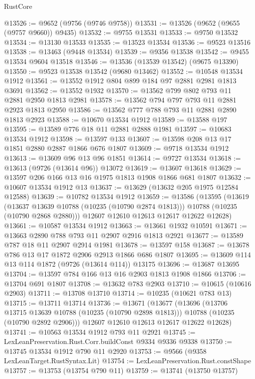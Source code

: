 \begin{lexlean}{RustCore}
\begin{coremodule}
@13526 := @9652 (@9756 (@9746 @9758))
@13531 := @13526 (@9652 (@9655 (@9757 @9660)) @9435)
@13532 := @9755 @13531
@13533 := @9750 @13532
@13534 := @13130 @13533
@13535 := @13523 @13534
@13536 := @9523 @13516
@13538 := @13463 (@9448 @13534)
@13539 := @9356 @13538
@13542 := @9455 @13534 @9604 @13518
@13546 := @13536 (@13539 @13542) (@9675 @13390)
@13550 := @9523 @13538 @13542 (@9680 @13462)
@13552 := @10548 @13534 @1912
@13561 := @13552 @1912 @804 @899 @184 @97 @2881 @2981 @1813 @3691
@13562 := @13552 @1932
@13570 := @13562 @799 @802 @793 @11 @2881 @2950 @1813 @2981
@13578 := @13562 @794 @797 @793 @11 @2881 @2923 @1813 @2950
@13586 := @13562 @777 @788 @793 @11 @2881 @2890 @1813 @2923
@13588 := @10670 @13534 @1912
@13589 := @13588 @197
@13595 := @13589 @776 @18 @11 @2881 @2888 @1981
@13597 := @10683 @13534 @1912
@13598 := @13597 @133
@13607 := @13598 @208 @13 @17 @1851 @2880 @2887 @1866 @676 @1807
@13609 := @9718 @13534 @1912
@13613 := @13609 @96 @13 @96 @1851
@13614 := @9727 @13534
@13618 := @13613 (@9726 (@13614 @96)) @13072
@13619 := @13607 @13618
@13629 := @13597 @206 @166 @13 @16 @1975 @1813 @1908 @1866 @681 @1807
@13632 := @10607 @13534 @1912 @13
@13637 := @13629 (@13632 @205 @1975 @12584 @12588)
@13639 := @10782 @13534 @1912
@13659 := @13586
    (@13595
      (@13619
        (@13637 @13639 @10788 (@10235 (@10790 @2874 @1813)))
        @10788
        (@10235 (@10790 @2868 @2880)))
      @12607
      @12610
      @12613
      @12617
      @12622
      @12628)
@13661 := @10587 @13534 @1912
@13663 := @13661 @1932 @10591
@13671 := @13663 @2890 @788 @793 @11 @2907 @2916 @1813 @2921
@13677 := @13589 @787 @18 @11 @2907 @2914 @1981
@13678 := @13597 @158
@13687 := @13678 @786 @13 @17 @1872 @2906 @2913 @1866 @686 @1807
@13695 := @13609 @114 @13 @114 @1872 (@9726 (@13614 @114)) @13175
@13696 := @13687 @13695
@13704 := @13597 @784 @166 @13 @16 @2903 @1813 @1908 @1866
@13706 := @13704 @691 @1807
@13708 := @13632 @783 @2903
@13710 := @10615 (@10616 @2903)
@13711 := @13708 @13710
@13714 := @10235 (@10621 @783 @13)
@13715 := @13711 @13714
@13736 := @13671
    (@13677
      (@13696
        (@13706 @13715 @13639 @10788 (@10235 (@10790 @2898 @1813)))
        @10788
        (@10235 (@10790 @2892 @2906)))
      @12607
      @12610
      @12613
      @12617
      @12622
      @12628)
@13741 := @10563 @13534 @1912 @793 @11 @2921
@13745 := LexLeanPreservation.Rust.Corr.buildConst @9334 @9336 @9338
@13750 := @13745 @13534 @1912 @790 @11 @2920
@13753 := @9566 (@9358 LexLeanTarget.RustSyntax.Lit)
@13754 := LexLeanPreservation.Rust.constShape
@13757 := @13753 (@13754 @790 @11)
@13759 := @13741 (@13750 @13757)

\end{coremodule}
\end{lexlean}
